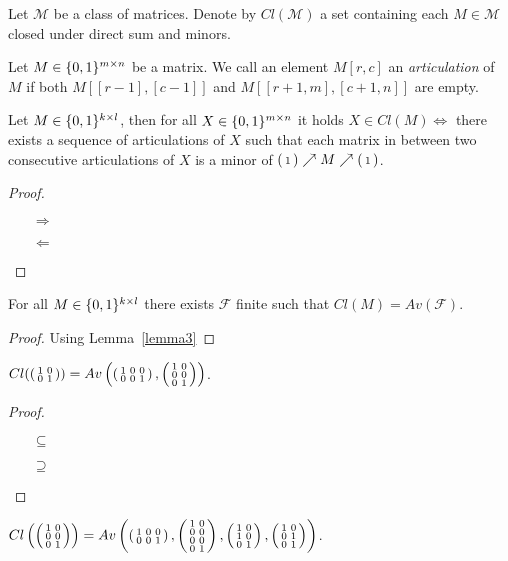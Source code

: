 \begin{ntn}
Let $\mathcal{M}$ be a class of matrices. Denote by $Cl(\mathcal{M})$ a set containing each $M\in\mathcal{M}$ closed under direct sum and minors.
\end{ntn}\begin{defn}
Let $M\in\{0,1\}^{m\times n}$ be a matrix. We call an element $M[r,c]$ an \emph{articulation} of $M$ if both $M[[r-1],[c-1]]$ and $M[[r+1,m],[c+1,n]]$ are empty.
\end{defn}
\begin{lemma}
\label{lemma3}
Let $M\in\{0,1\}^{k\times l}$, then for all $X\in\{0,1\}^{m\times n}$ it holds $X\in Cl(M)\Leftrightarrow$ there exists a sequence of articulations of $X$ such that each matrix in between two consecutive articulations of $X$ is a minor of $\left(\begin{smallmatrix}1\end{smallmatrix}\right)\nearrow M\nearrow\left(\begin{smallmatrix}1\end{smallmatrix}\right)$.  
\end{lemma}
\begin{proof}
\begin{itemize}
\item[$\Rightarrow$]
\item[$\Leftarrow$]
\end{itemize}
\end{proof}
\begin{thm}
For all $M\in\{0,1\}^{k\times l}$ there exists $\mathcal{F}$ finite such that $Cl(M)=Av(\mathcal{F})$.
\end{thm}
\begin{proof}
Using Lemma~\ref{lemma3}
\end{proof}
\begin{thm}
$Cl(\left(\begin{smallmatrix}1&0\\0&1\end{smallmatrix}\right))=Av\left(\left(\begin{smallmatrix}1&0&0\\0&0&1\end{smallmatrix}\right),\left(\begin{smallmatrix}1&0\\0&0\\0&1\end{smallmatrix}\right)\right)$.
\end{thm}
\begin{proof}
\begin{itemize}
\item[$\subseteq$]
\item[$\supseteq$]
\end{itemize}
\end{proof}
\begin{thm}
$Cl\left(\left(\begin{smallmatrix}1&0\\0&0\\0&1\end{smallmatrix}\right)\right)=Av\left(\left(\begin{smallmatrix}1&0&0\\0&0&1\end{smallmatrix}\right),\left(\begin{smallmatrix}1&0\\0&0\\0&0\\0&1\end{smallmatrix}\right),\left(\begin{smallmatrix}1&0\\1&0\\0&1\end{smallmatrix}\right),\left(\begin{smallmatrix}1&0\\0&1\\0&1\end{smallmatrix}\right)\right)$.
\end{thm}
